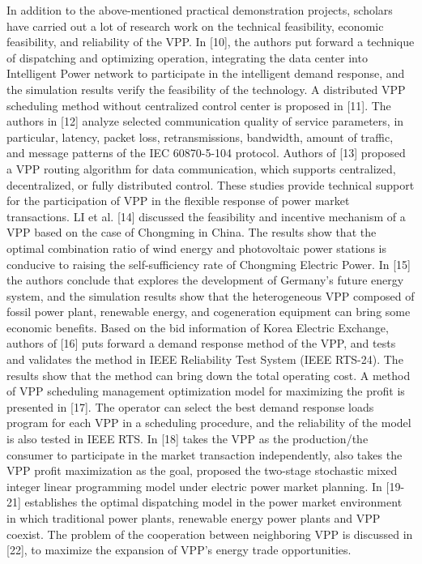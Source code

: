 \documentclass[twocolumn,a4paper]{IEEEtran}
\begin{document}
In addition to the above-mentioned practical demonstration projects, scholars have carried out a lot of research work on the technical feasibility, economic feasibility, and reliability of the VPP. 
In [10], the authors put forward a technique of dispatching and optimizing operation, integrating the data center into Intelligent Power network to participate in the intelligent demand response, and the simulation results verify the feasibility of the technology. 
A distributed VPP scheduling method without centralized control center is proposed in [11]. 
The authors in [12] analyze selected communication quality of service parameters, in particular, latency, packet loss, retransmissions, bandwidth, amount of traffic, and message patterns of the IEC 60870-5-104 protocol. 
Authors of [13] proposed a VPP routing algorithm for data communication, which supports centralized, decentralized, or fully distributed control. 
These studies provide technical support for the participation of VPP in the flexible response of power market transactions. 
LI et al. [14] discussed the feasibility and incentive mechanism of a VPP based on the case of Chongming in China. 
The results show that the optimal combination ratio of wind energy and photovoltaic power stations is conducive to raising the self-sufficiency rate of Chongming Electric Power. 
In [15] the authors conclude that explores the development of Germany's future energy system, and the simulation results show that the heterogeneous VPP composed of fossil power plant, renewable energy, and cogeneration equipment can bring some economic benefits. 
Based on the bid information of Korea Electric Exchange, authors of [16] puts forward a demand response method of the VPP, and tests and validates the method in IEEE Reliability Test System (IEEE RTS-24). 
The results show that the method can bring down the total operating cost. A method of VPP scheduling management optimization model for maximizing the profit is presented in [17]. 
The operator can select the best demand response loads program for each VPP in a scheduling procedure, and the reliability of the model is also tested in IEEE RTS. 
In [18] takes the VPP as the production/the consumer to participate in the market transaction independently, also takes the VPP profit maximization as the goal, proposed the two-stage stochastic mixed integer linear programming model under electric power market planning. 
In [19-21] establishes the optimal dispatching model in the power market environment in which traditional power plants, renewable energy power plants and VPP coexist. The problem of the cooperation between neighboring VPP is discussed in [22], to maximize the expansion of VPP's energy trade opportunities. 
\end{document}
